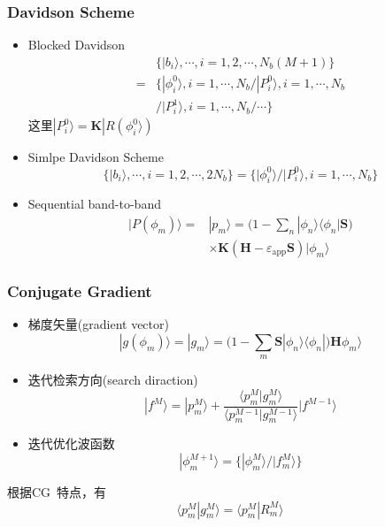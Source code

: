 \documentclass[cjk,slidestop,compress,mathserif,blue]{beamer}
\begin{document}
   \frame
   {
	   \frametitle{\textrm{Davidson Scheme}}
	   \begin{itemize}
		   \item \textrm{Blocked Davidson}
			   \begin{displaymath}
				   \begin{aligned}
					   &\{|b_i\rangle,\cdots,i=1,2,\cdots,N_b(M+1)\}\\
					   =&\{|\phi_i^0\rangle,i=1,\cdots,N_b/|P_i^0\rangle,i=1,\cdots,N_b\\
					   &/|P_i^1\rangle,i=1,\cdots,N_b/\cdots\}
				   \end{aligned}
			   \end{displaymath}
			   这里$|P_i^0\rangle=\mathbf{K}|R(\phi_i^0\rangle)$
		   \item \textrm{Simlpe Davidson Scheme}
			   \begin{displaymath}
				   \{|b_i\rangle,\cdots,i=1,2,\cdots,2N_b\}=\{|\phi_i^0\rangle/|P_i^0\rangle,i=1,\cdots,N_b\}
			   \end{displaymath}
		   \item \textrm{Sequential band-to-band}
			   \begin{displaymath}
				   \begin{aligned}
					   |P(\phi_m)\rangle=&|p_m\rangle=\bigg(1-\sum_n|\phi_n\rangle\langle\phi_n|\mathbf{S}\bigg)\\
					   &\times\mathbf{K}(\mathbf{H}-\varepsilon_{\mathrm{app}}\mathbf{S})|\phi_m\rangle
				   \end{aligned}
			   \end{displaymath}
	   \end{itemize}
   }

   \frame
   {
	   \frametitle{\textrm{Conjugate Gradient}}
	   \begin{itemize}
		   \item 梯度矢量(\textrm{gradient vector})
			   \begin{displaymath}
				   |g(\phi_m)\rangle=|g_m\rangle=\bigg(1-\sum_m\mathbf{S}|\phi_n\rangle\langle\phi_n|\bigg)\mathbf{H}\phi_m\rangle
			   \end{displaymath}
		   \item 迭代检索方向(\textrm{search diraction})
			   \begin{displaymath}
				   |f^M\rangle=|p_m^M\rangle+\dfrac{\langle p_m^M|g_m^M\rangle}{\langle p_m^{M-1}|g_m^{M-1}\rangle}|f^{M-1}\rangle
			   \end{displaymath}
		   \item 迭代优化波函数
			   \begin{displaymath}
				   |\phi_m^{M+1}\rangle=\{|\phi_m^{M}\rangle/|f_m^M\rangle\}
			   \end{displaymath}
	   \end{itemize}
	   根据\textrm{CG}~特点，有
	   \begin{displaymath}
		   \langle p_m^M|g_m^M\rangle=\langle p_m^M|R_m^M\rangle
	   \end{displaymath}
   }
\end{document}
